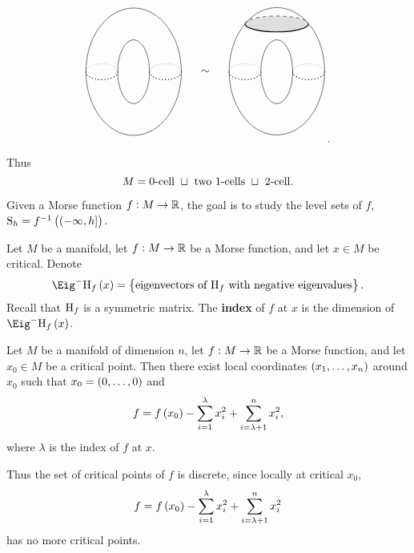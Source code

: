 \begin{example}
\begin{itemize}
$$\begin{tikzpicture}
\draw (0, 0) ellipse (1.5 and 2);
\draw (0, 0) ellipse (0.5 and 1);
\draw [dotted, thick] (-1.5, 0) arc (-180:0:0.5 and 0.25);
\draw [dotted, thick] (0.5, 0) arc (-180:0:0.5 and 0.25);
\draw [dotted] (-0.5, 0) arc (0:180:0.5 and 0.25);
\draw [dotted] (1.5, 0) arc (0:180:0.5 and 0.25);
\draw (2.25, 0) node{$ \sim $};
\draw (3.5, 1.5) arc (-228:48:1.5 and 2);
\draw (4.5, 0) ellipse (0.5 and 1);
\fill [lightgray, opacity=0.5] (4.5, 1.5) ellipse (1 and 0.25);
\draw [dotted, thick] (3, 0) arc (-180:0:0.5 and 0.25);
\draw [dotted, thick] (5, 0) arc (-180:0:0.5 and 0.25);
\draw [dotted] (3, 0) arc (180:0:0.5 and 0.25);
\draw [dotted] (5, 0) arc (180:0:0.5 and 0.25);
\draw [dashed] (3.5, 1.5) arc (180:0:1 and 0.25);
\draw [thick] (3.5, 1.5) arc (-180:0:1 and 0.25);
\draw (3.5, 1.5) arc (132:48:1.5 and 2);
\end{tikzpicture}.
$$
\end{itemize}
Thus
$$ M = \text{$ 0 $-cell} \ \sqcup \ \text{two $ 1 $-cells} \ \sqcup \ \text{$ 2 $-cell}. $$
\end{example}

Given a Morse function $ f : M \to \mathbb{R} $, the goal is to study the level sets of $ f $, $ \S_h = f^{-1}\br{\intoc{-\infty, h}} $.

\begin{definition}
Let $ M $ be a manifold, let $ f : M \to \mathbb{R} $ be a Morse function, and let $ x \in M $ be critical. Denote
$$ \Eig^- \H_f\br{x} = \cbr{\text{eigenvectors of} \ \H_f \ \text{with negative eigenvalues}}. $$
Recall that $ \mathrm{H}_f $ is a symmetric matrix. The \textbf{index} of $ f $ at $ x $ is the dimension of $ \Eig^- \H_f\br{x} $.
\end{definition}

\pagebreak

\begin{lemma}[Morse]
Let $ M $ be a manifold of dimension $ n $, let $ f : M \to \mathbb{R} $ be a Morse function, and let $ x_0 \in M $ be a critical point. Then there exist local coordinates $ \br{x_1, \dots, x_n} $ around $ x_0 $ such that $ x_0 = \br{0, \dots, 0} $ and
$$ f = f\br{x_0} - \sum_{i = 1}^\lambda x_i^2 + \sum_{i = \lambda + 1}^n x_i^2, $$
where $ \lambda $ is the index of $ f $ at $ x $.
\end{lemma}

Thus the set of critical points of $ f $ is discrete, since locally at critical $ x_0 $,
$$ f = f\br{x_0} - \sum_{i = 1}^\lambda x_i^2 + \sum_{i = \lambda + 1}^n x_i^2 $$
has no more critical points.

